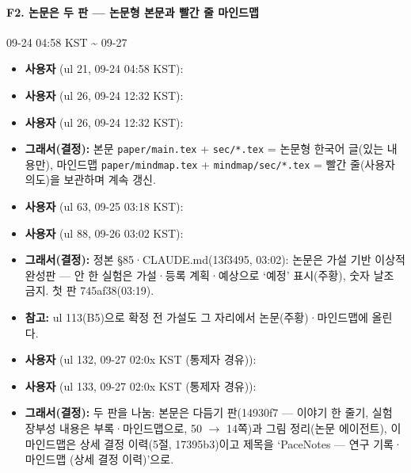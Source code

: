 \paragraph{F2. 논문은 두 판 --- 논문형 본문과 빨간 줄 마인드맵}
{\small 09-24 04:58 KST \textasciitilde{} 09-27}
\begin{itemize}
  \item \textbf{사용자} (ul 21, 09-24 04:58 KST): 
  \item \textbf{사용자} (ul 26, 09-24 12:32 KST): 
  \item \textbf{사용자} (ul 26, 09-24 12:32 KST): 
  \item \textbf{그래서(결정):} 본문 \texttt{paper/\allowbreak{}main.\allowbreak{}tex} + \texttt{sec/\allowbreak{}*.\allowbreak{}tex} = 논문형 한국어 글(있는 내용만), 마인드맵 \texttt{paper/\allowbreak{}mindmap.\allowbreak{}tex} + \texttt{mindmap/\allowbreak{}sec/\allowbreak{}*.\allowbreak{}tex} = 빨간 줄(사용자 의도)을 보관하며 계속 갱신.
  \item \textbf{사용자} (ul 63, 09-25 03:18 KST): 
  \item \textbf{사용자} (ul 88, 09-26 03:02 KST): 
  \item \textbf{그래서(결정):} 정본 §85·CLAUDE.md(13f3495, 03:02): 논문은 가설 기반 이상적 완성판 --- 안 한 실험은 가설·등록 계획·예상으로 `예정' 표시(주황), 숫자 날조 금지. 첫 판 745af38(03:19).
  \item \textbf{참고:} ul 113(B5)으로 확정 전 가설도 그 자리에서 논문(주황)·마인드맵에 올린다. 
  \item \textbf{사용자} (ul 132, 09-27 02:0x KST (통제자 경유)): 
  \item \textbf{사용자} (ul 133, 09-27 02:0x KST (통제자 경유)): 
  \item \textbf{그래서(결정):} 두 판을 나눔: 본문은 다듬기 판(14930f7 --- 이야기 한 줄기, 실험 장부성 내용은 부록·마인드맵으로, 50 $\rightarrow$ 14쪽)과 그림 정리(논문 에이전트), 이 마인드맵은 상세 결정 이력(5절, 17395b3)이고 제목을 `PaceNotes --- 연구 기록·마인드맵 (상세 결정 이력)'으로.
\end{itemize}

